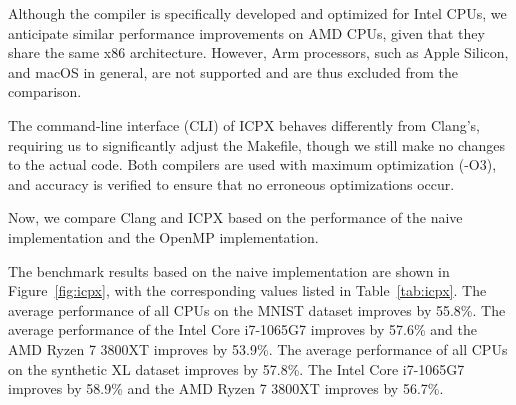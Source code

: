 \documentclass[modern,longauthor]{aastex7}
\begin{document}
Although the compiler is specifically developed and optimized for Intel CPUs, we anticipate similar performance improvements on AMD CPUs, given that they share the same x86 architecture. However, Arm processors, such as Apple Silicon, and macOS in general, are not supported and are thus excluded from the comparison.

The command-line interface (CLI) of ICPX behaves differently from Clang's, requiring us to significantly adjust the Makefile, though we still make no changes to the actual code. Both compilers are used with maximum optimization (-O3), and accuracy is verified to ensure that no erroneous optimizations occur.

Now, we compare Clang and ICPX based on the performance of the naive implementation and the OpenMP implementation.

The benchmark results based on the naive implementation are shown in Figure~\ref{fig:icpx}, with the corresponding values listed in Table~\ref{tab:icpx}. The average performance of all CPUs on the MNIST dataset improves by 55.8\%. The average performance of the Intel Core i7-1065G7 improves by 57.6\% and the AMD Ryzen 7 3800XT improves by 53.9\%. The average performance of all CPUs on the synthetic XL dataset improves by 57.8\%. The Intel Core i7-1065G7 improves by 58.9\% and the AMD Ryzen 7 3800XT improves by 56.7\%.
\end{document}
